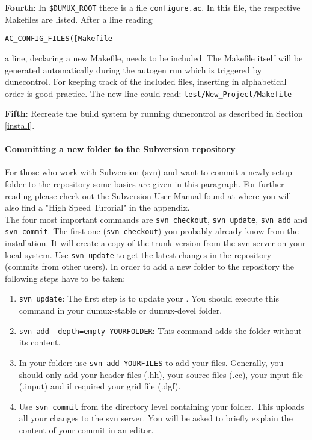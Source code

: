 \textbf{Fourth}: In \verb+$DUMUX_ROOT+ there is a file \verb+configure.ac+. In this file, the respective Makefiles are listed. After a line reading

 \verb+AC_CONFIG_FILES([Makefile+ 

 \noindent a line, declaring a new Makefile, needs to be included. The Makefile itself will be generated automatically during the autogen run which is triggered by dunecontrol. For keeping track of the included files, inserting in alphabetical order is good practice. The new line could read: \verb+test/New_Project/Makefile+ 

\textbf{Fifth}: Recreate the build system by running dunecontrol as described in Section \ref{install}.

\paragraph{Committing a new folder to the Subversion repository}
For those who work with Subversion (svn) and want to commit a newly setup folder to the repository some basics are
given in this paragraph. For further reading please check out the Subversion User Manual found at \cite{APACHE-SUBVERSION-HP}
where you will also find a "High Speed Turorial" in the appendix. \\
The four most important commands are \texttt{svn checkout}, \texttt{svn update},  \texttt{svn add} 
and \texttt{svn commit}. The first one (\texttt{svn checkout}) you probably already know from the \Dumux installation.
It will create a copy of the trunk version from the svn server on your local system. Use \texttt{svn update} to get the
latest changes in the repository (commits from other users). In order to add a new folder to the repository the following
steps have to be taken:

\begin{enumerate}[1)]
 \item \texttt{svn update}: The first step is to update your \Dumux. You should execute this command in your
dumux-stable or dumux-devel folder.
 \item \texttt{svn add --depth=empty YOURFOLDER}: This command adds the folder without its content.
 \item In your folder: use \texttt{svn add YOURFILES} to add your files. Generally, you should only add
your header files (.hh), your source files (.cc), your input file (.input) and if required your grid file (.dgf).
\item Use \texttt{svn commit} from the directory level containing your folder. This uploads all your changes to the
svn server. You will be asked to briefly explain the content of your commit in an editor.
\end{enumerate}

